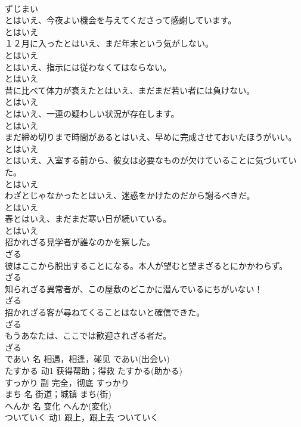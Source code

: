 \documentclass[8pt]{extreport}
\begin{document}
\begin{CJK}{UTF8}{min}
\\	ずじまい	
\\	とはいえ、今夜よい機会を与えてくださって感謝しています。	
\\	とはいえ	
\\	１２月に入ったとはいえ、まだ年末という気がしない。	
\\	とはいえ	
\\	とはいえ、指示には従わなくてはならない。	
\\	とはいえ	
\\	昔に比べて体力が衰えたとはいえ、まだまだ若い者には負けない。	
\\	とはいえ	
\\	とはいえ、一連の疑わしい状況が存在します。	
\\	とはいえ	
\\	まだ締め切りまで時間があるとはいえ、早めに完成させておいたほうがいい。	
\\	とはいえ	
\\	とはいえ、入室する前から、彼女は必要なものが欠けていることに気づいていた。	
\\	とはいえ	
\\	わざとじゃなかったとはいえ、迷惑をかけたのだから謝るべきだ。	
\\	とはいえ	
\\	春とはいえ、まだまだ寒い日が続いている。	
\\	とはいえ	
\\	招かれざる見学者が誰なのかを察した。	
\\	ざる	
\\	彼はここから脱出することになる。本人が望むと望まざるとにかかわらず。	
\\	ざる	
\\	知られざる異常者が、この屋敷のどこかに潜んでいるにちがいない！	
\\	ざる	
\\	招かれざる客が尋ねてくることはないと確信できた。	
\\	ざる	
\\	もうあなたは、ここでは歓迎されざる者だ。	
\\	ざる	
\\	であい	名	相遇，相逢，碰见	であい(出会い)	
\\	たすかる	动1	获得帮助；得救	たすかる(助かる)	
\\	すっかり	副	完全，彻底	すっかり	
\\	まち	名	街道；城镇	まち(街)	
\\	へんか	名	变化	へんか(変化)	
\\	ついていく	动1	跟上，跟上去	ついていく	

\end{CJK}
\end{document}

